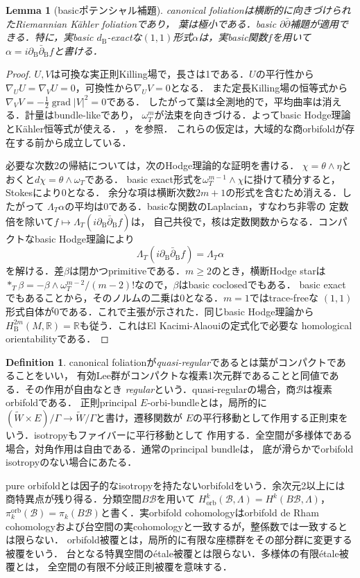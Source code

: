\documentclass[12pt]{amsart}
\newtheorem{lem}[thm]{Lemma}
\theoremstyle{definition}
\newtheorem{defn}[thm]{Definition}
\theoremstyle{remark}
\numberwithin{equation}{section}
\newcommand{\cB}{\mathcal{B}}
\newcommand{\orb}{\mathrm{orb}}
\newcommand{\R}{\mathbb{R}}
\newcommand{\bas}{\mathrm{B}}
\newcommand{\wt}{\omega_{T}}
\begin{document}
\begin{lem}[basicポテンシャル補題]\label{lem:ddbar}
canonical foliationは横断的に向きづけられたRiemannian K\"ahler foliationであり，
葉は極小である．basic $\partial\bar\partial$補題が適用できる．特に，実basic
$d_{\bas}$-exactな$(1,1)$形式$\alpha$は，実basic関数$f$を用いて
$\alpha=i\partial_{\bas}\bar\partial_{\bas}f$と書ける．
\end{lem}
\begin{proof}
$U,V$は可換な実正則Killing場で，長さは1である．$U$の平行性から
$\nabla_UU=\nabla_VU=0$，可換性から$\nabla_UV=0$となる．
また定長Killing場の恒等式から
$\nabla_VV=-\tfrac12\operatorname{grad}|V|^2=0$である．
したがって葉は全測地的で，平均曲率は消える．計量はbundle-likeであり，
$\wt^m$が法束を向きづける．よってbasic Hodge理論とK\"ahler恒等式が使える．
\cite[Sections 3.3--3.4, Proposition 3.5.1]{EK}，\cite[Section 2.2]{IO}を参照．
これらの仮定は，大域的な商orbifoldが存在する前から成立している．

必要な次数2の帰結については，次のHodge理論的な証明を書ける．
$\chi=\theta\wedge\eta$とおくと$d\chi=\theta\wedge\wt$である．
basic exact形式を$\wt^{m-1}\wedge\chi$に掛けて積分すると，Stokesにより0となる．
余分な項は横断次数$2m+1$の形式を含むため消える．したがって
$\Lambda_T\alpha$の平均は0である．basicな関数のLaplacian，すなわち非零の
定数倍を除いて$f\mapsto\Lambda_T(i\partial_{\bas}\bar\partial_{\bas}f)$は，
自己共役で，核は定数関数からなる．コンパクトなbasic Hodge理論により
\[
\Lambda_T(i\partial_{\bas}\bar\partial_{\bas}f)=\Lambda_T\alpha
\]
を解ける．差$\beta$は閉かつprimitiveである．$m\geq2$のとき，横断Hodge starは
$*_T\beta=-\beta\wedge\wt^{m-2}/(m-2)!$なので，$\beta$はbasic coclosedでもある．
basic exactでもあることから，そのノルムの二乗は0となる．$m=1$ではtrace-freeな
$(1,1)$形式自体が0である．これで主張が示された．同じbasic Hodge理論から
$H_{\bas}^{2m}(M,\R)=\R$も従う．これはEl Kacimi-Alaouiの定式化で必要な
homological orientabilityである．
\end{proof}

\begin{defn}\label{def:orb}
canonical foliationが\emph{quasi-regular}であるとは葉がコンパクトであることをいい，
有効Lee群がコンパクトな複素1次元群であることと同値である．その作用が自由なとき
\emph{regular}という．quasi-regularの場合，商$\cB$は複素orbifoldである．
正則principal $E$-orbi-bundleとは，局所的に
$(\widetilde W\times E)/\Gamma\to\widetilde W/\Gamma$と書け，遷移関数が
$E$の平行移動として作用する正則束をいう．isotropyもファイバーに平行移動として
作用する．全空間が多様体である場合，対角作用は自由である．通常のprincipal bundleは，
底が滑らかでorbifold isotropyのない場合にあたる．

pure orbifoldとは因子的なisotropyを持たないorbifoldをいう．余次元2以上には
商特異点が残り得る．分類空間$B\cB$を用いて
$H^k_{\orb}(\cB,\Lambda)=H^k(B\cB,\Lambda)$，
$\pi_k^{\orb}(\cB)=\pi_k(B\cB)$と書く．実orbifold cohomologyはorbifold de Rham
cohomologyおよび台空間の実cohomologyと一致するが，整係数では一致するとは限らない．
orbifold被覆とは，局所的に有限な座標群をその部分群に変更する被覆をいう．
台となる特異空間の\'etale被覆とは限らない．多様体の有限\'etale被覆とは，
全空間の有限不分岐正則被覆を意味する．
\end{defn}
\end{document}
